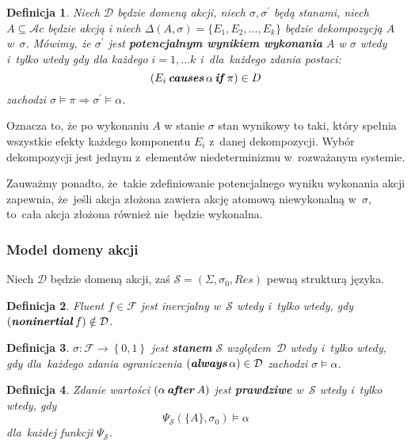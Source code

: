 \documentclass[11pt,a4paper]{article}
\newtheorem{defn}{Definicja}
\DeclareMathOperator{\After}{\textbf{\textit{after}}}
\DeclareMathOperator{\Causes}{\textbf{\textit{causes}}}
\DeclareMathOperator{\If}{\textbf{\textit{if}}}
\DeclareMathOperator{\Always}{\textbf{\textit{always}}}
\DeclareMathOperator{\Noninertial}{\textbf{\textit{noninertial}}}
\begin{document}
\begin{defn}
    Niech $\mathcal{D}$ będzie domeną akcji, niech $\sigma, \sigma^\prime$ będą stanami, niech $A \subseteq \mathcal{A}c$ będzie akcją i niech $\Delta(A, \sigma) = \{ E_1, E_2, \dots, E_k \}$ będzie dekompozycją $A$ w~$\sigma$.
    Mówimy, że $\sigma^\prime$ jest \textbf{potencjalnym wynikiem wykonania} $A$ w $\sigma$ wtedy i~tylko wtedy gdy dla każdego $i = 1, \dots k$ i~dla~każdego zdania postaci: 
    $$ (E_i \Causes \alpha \If \pi) \in D $$
    zachodzi $\sigma \models \pi \Rightarrow \sigma^\prime \models \alpha $.
\end{defn} 
    
Oznacza to, że po wykonaniu $A$ w stanie $\sigma$ stan wynikowy to taki, który spełnia wszystkie efekty każdego komponentu $E_i$ z~danej dekompozycji.
Wybór dekompozycji jest jednym z~elementów niedeterminizmu w~rozważanym systemie.

Zauważmy ponadto, że~takie zdefiniowanie potencjalnego wyniku wykonania akcji zapewnia, że~jeśli akcja złożona zawiera akcję atomową niewykonalną w~$\sigma$, to~cała akcja złożona również nie~będzie wykonalna.

\subsubsection{Model domeny akcji}

Niech $\mathcal{D}$ będzie domeną akcji, zaś $\mathcal{S} = \left(\Sigma, \sigma_0, Res\right)$ pewną strukturą języka.

\begin{defn}
    Fluent $f \in \mathcal{F}$ jest inercjalny w~$\mathcal{S}$ wtedy i~tylko wtedy, gdy $\left(\Noninertial f\right) \notin \mathcal{D}$.
\end{defn}

\begin{defn}
    $\sigma : \mathcal{F} \rightarrow \left\{0,1\right\}$ jest \textbf{stanem} $\mathcal{S}$ względem~$\mathcal{D}$ wtedy i~tylko wtedy, gdy dla~każdego zdania ograniczenia $\left(\Always \alpha\right) \in \mathcal{D}$ zachodzi $\sigma \models \alpha$.
\end{defn}

\begin{defn}
    Zdanie wartości $(\alpha \After A)$ jest \textbf{prawdziwe} w~$\mathcal{S}$ wtedy i~tylko wtedy, gdy
    $$\Psi_{\mathcal{S}}(\{ A \}, \sigma_0) \models \alpha$$
    dla~każdej funkcji $\Psi_{\mathcal{S}}$.
\end{defn}
\end{document}
